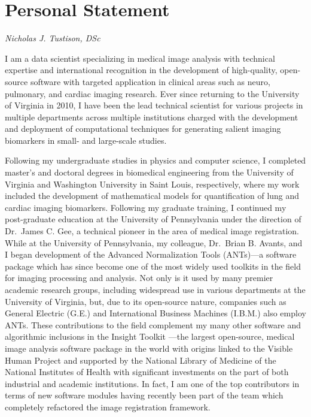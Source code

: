 \documentclass[12pt,]{article}
\title{}
\author{}
\date{}
\begin{document}
\maketitle


\section{Personal Statement}\label{personal-statement}

\emph{Nicholas J. Tustison, DSc}

I am a data scientist specializing in medical image analysis with
technical expertise and international recognition in the development of
high-quality, open-source software with targeted application in clinical
areas such as neuro, pulmonary, and cardiac imaging research. Ever since
returning to the University of Virginia in 2010, I have been the lead
technical scientist for various projects in multiple departments across
multiple institutions charged with the development and deployment of
computational techniques for generating salient imaging biomarkers in
small- and large-scale studies.

Following my undergraduate studies in physics and computer science, I
completed master's and doctoral degrees in biomedical engineering from
the University of Virginia and Washington University in Saint Louis,
respectively, where my work included the development of mathematical
models for quantification of lung and cardiac imaging biomarkers.
Following my graduate training, I continued my post-graduate education
at the University of Pennsylvania under the direction of Dr.~James C.
Gee, a technical pioneer in the area of medical image registration.
While at the University of Pennsylvania, my colleague, Dr.~Brian B.
Avants, and I began development of the Advanced Normalization Tools
(ANTs)---a software package which has since become one of the most
widely used toolkits in the field for imaging processing and analysis.
Not only is it used by many premier academic research groups, including
widespread use in various departments at the University of Virginia,
but, due to its open-source nature, companies such as General Electric
(G.E.) and International Business Machines (I.B.M.) also employ ANTs.
These contributions to the field complement my many other software and
algorithmic inclusions in the Insight Toolkit ---the largest
open-source, medical image analysis software package in the world with
origins linked to the Visible Human Project and supported by the
National Library of Medicine of the National Institutes of Health with
significant investments on the part of both industrial and academic
institutions. In fact, I am one of the top contributors in terms of new
software modules having recently been part of the team which completely
refactored the image registration framework.
\end{document}
